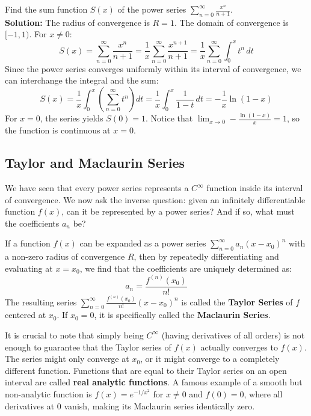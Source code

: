 \begin{example}
Find the sum function $S(x)$ of the power series $\sum_{n=0}^{\infty} \frac{x^n}{n+1}$.
\\ \textbf{Solution:} The radius of convergence is $R = 1$. The domain of convergence is $[-1, 1)$.
For $x \neq 0$:
\[ S(x) = \sum_{n=0}^{\infty} \frac{x^n}{n+1} = \frac{1}{x} \sum_{n=0}^{\infty} \frac{x^{n+1}}{n+1} = \frac{1}{x} \sum_{n=0}^{\infty} \int_0^x t^n \, dt \]
Since the power series converges uniformly within its interval of convergence, we can interchange the integral and the sum:
\[ S(x) = \frac{1}{x} \int_0^x \left(\sum_{n=0}^{\infty} t^n\right) dt = \frac{1}{x} \int_0^x \frac{1}{1-t} \, dt = -\frac{1}{x} \ln(1-x) \]
For $x = 0$, the series yields $S(0) = 1$. Notice that $\lim_{x \to 0} -\frac{\ln(1-x)}{x} = 1$, so the function is continuous at $x = 0$.
\end{example}

\subsection{Taylor and Maclaurin Series}

We have seen that every power series represents a $C^\infty$ function inside its interval of convergence. We now ask the inverse question: given an infinitely differentiable function $f(x)$, can it be represented by a power series? And if so, what must the coefficients $a_n$ be?

\begin{theorem}
If a function $f(x)$ can be expanded as a power series $\sum_{n=0}^{\infty} a_n (x-x_0)^n$ with a non-zero radius of convergence $R$, then by repeatedly differentiating and evaluating at $x=x_0$, we find that the coefficients are uniquely determined as:
\[ a_n = \frac{f^{(n)}(x_0)}{n!} \]
The resulting series $\sum_{n=0}^{\infty} \frac{f^{(n)}(x_0)}{n!} (x-x_0)^n$ is called the \textbf{Taylor Series} of $f$ centered at $x_0$. If $x_0=0$, it is specifically called the \textbf{Maclaurin Series}.
\end{theorem}

\begin{remark}[Analyticity]
It is crucial to note that simply being $C^\infty$ (having derivatives of all orders) is not enough to guarantee that the Taylor series of $f(x)$ actually converges to $f(x)$. The series might only converge at $x_0$, or it might converge to a completely different function. Functions that are equal to their Taylor series on an open interval are called \textbf{real analytic functions}. A famous example of a smooth but non-analytic function is $f(x) = e^{-1/x^2}$ for $x \neq 0$ and $f(0) = 0$, where all derivatives at $0$ vanish, making its Maclaurin series identically zero.
\end{remark}

